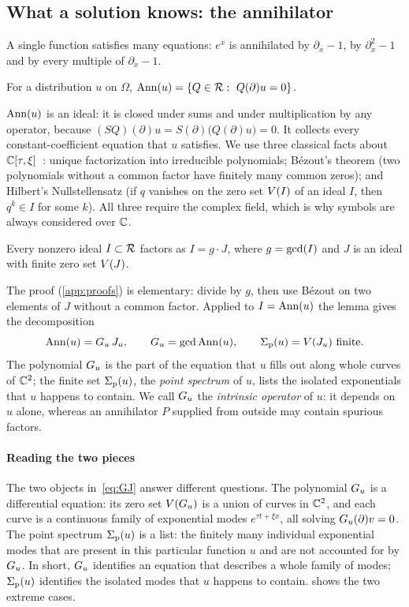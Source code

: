 \subsection{What a solution knows: the annihilator}\label{sec:ann}
A single function satisfies many equations: $e^{x}$ is annihilated by $\partial_x-1$, by
$\partial_x^2-1$ and by every multiple of $\partial_x-1$.

\begin{definition}[Annihilator]\label{def:ann}
For a distribution $u$ on $\Omega$, $\Ann(u)=\{Q\in\ring:\ Q(\partial)u=0\}$.
\end{definition}

$\operatorname{Ann}(u)$ is an ideal: it is closed under sums and under multiplication by any operator, because
$(SQ)(\partial)u=S(\partial)\big(Q(\partial)u\big)=0$. It collects every constant-coefficient equation
that $u$ satisfies. We use three classical facts about $\mathbb{C}[\tau,\xi]$~\cite{CLO15}:
unique factorization into irreducible polynomials; B\'ezout's theorem (two polynomials without a
common factor have finitely many common zeros); and Hilbert's Nullstellensatz (if $q$ vanishes on
the zero set $V(I)$ of an ideal $I$, then $q^k\in I$ for some $k$). All three require the complex
field, which is why symbols are always considered over $\mathbb{C}$.

\begin{lemma}\label{lem:gcd}
Every nonzero ideal $I\subset\mathcal{R}$ factors as $I=g\cdot J$, where $g=\operatorname{gcd}(I)$ and $J$ is an ideal
with finite zero set $V(J)$.
\end{lemma}

The proof (\cref{app:proofs}) is elementary: divide by $g$, then use B\'ezout on two elements of $J$
without a common factor. Applied to $I=\operatorname{Ann}(u)$ the lemma gives the decomposition
\begin{equation}\label{eq:GJ}
  \Ann(u)=\Gu\,\Ju,\qquad \Gu=\gcdop\Ann(u),\qquad \sigp(u)=\Var(\Ju)\ \text{finite}.
\end{equation}
The polynomial $G_u$ is the part of the equation that $u$ fills out along whole curves of $\mathbb{C}^2$;
the finite set $\Sigma_{\mathrm p}(u)$, the \emph{point spectrum} of $u$, lists the isolated exponentials that $u$
happens to contain. We call $G_u$ the \emph{intrinsic operator} of $u$: it depends on $u$ alone,
whereas an annihilator $P$ supplied from outside may contain spurious factors.

\paragraph{Reading the two pieces}
The two objects in~\eqref{eq:GJ} answer different questions. The polynomial $G_u$ is a differential
equation: its zero set $V(G_u)$ is a union of curves in $\mathbb{C}^2$, and each curve is a continuous family of
exponential modes $e^{\tau t+\xi x}$, all solving $G_u(\partial)v=0$. The point spectrum $\Sigma_{\mathrm p}(u)$ is a list: the
finitely many individual exponential modes that are present in this particular function $u$ and are not
accounted for by $G_u$. In short, $G_u$ identifies an equation that describes a whole family of modes;
$\Sigma_{\mathrm p}(u)$ identifies the isolated modes that $u$ happens to contain.  shows the two
extreme cases.

